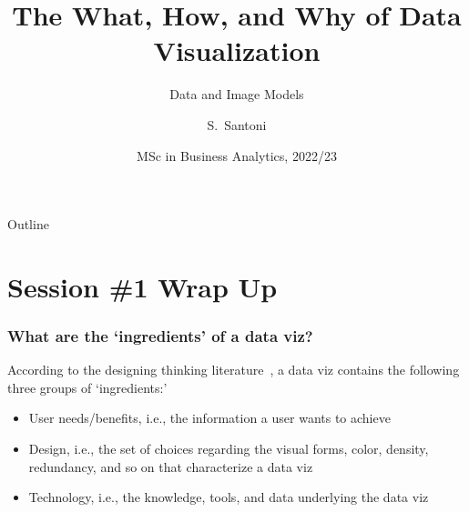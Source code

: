 \documentclass[notes, aspectratio=1610]{beamer}
\title[What, how, and why of data viz]%
{The What, How, and Why of Data Visualization}
\subtitle{Data and Image Models}
\author{S.~Santoni\inst{1}\inst{2}}
\institute{
	\inst{1}%
	Bayes Business School
	\and
	\inst{2}%
	Soundcloud
	}
\date{MSc in Business Analytics, 2022/23}
\begin{document}
\begin{frame}
	\titlepage
\end{frame}

\begin{frame}{Outline}
	\tableofcontents
\end{frame}

\section{Session \#1 Wrap Up}

\begin{frame}
	\frametitle{What are the `ingredients' of a data viz?}
		According to the designing thinking literature~\cite{ware2010}, 
		a data viz contains the following three groups of `ingredients:'
		\begin{itemize}
			\item
			User needs/benefits, i.e., the information 
			a user wants to achieve
			\item
			Design, i.e., the set of choices regarding the
			visual forms, color, density, redundancy, and so on
			that characterize a data viz
			\item
			Technology, i.e., the knowledge, tools, and 
			data underlying the data viz
		\end{itemize}
\end{frame}
\end{document}
